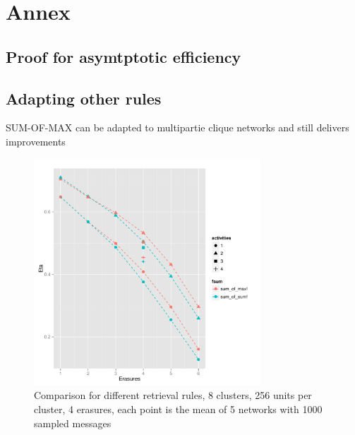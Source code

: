 \documentclass[english,10pt,twocolumn]{IEEEtran}
\theoremstyle{definition}
\begin{document}
	
	
	\section*{Annex}
	
	\subsection*{Proof for asymtptotic efficiency}
	
	\subsection*{Adapting other rules}
	
	SUM-OF-MAX can be adapted to multipartie clique networks and still delivers improvements
	
	\begin{figure}[!htb]
		\includegraphics[width=8.5cm]{Courbes/comp_rulesmax}%
		\caption{Comparison for different retrieval rules, 8 clusters, 256 units per cluster, 4 erasures, each point is the mean of 5 networks with 1000 sampled messages}
		\label{fmaxth}
	\end{figure}
	
	
	
	
	\nocite{*}
     {}
\end{document}
